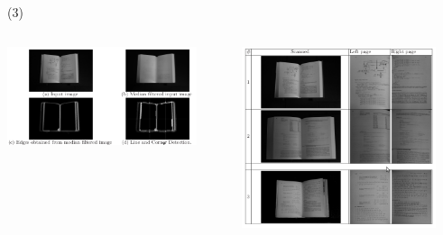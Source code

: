 \begin{frame}{ (3)}
\begin{columns}
\begin{column}{0.5\textwidth}
     \begin{center}
     \includegraphics[width=0.88\textwidth]{Figs/BookScanner3}
     \end{center}

\end{column}
\begin{column}{0.5\textwidth}  
    \begin{center}
     \includegraphics[width=0.88\textwidth]{Figs/BookScanner4}
     \end{center}
\end{column}
\end{columns}
\end{frame}


